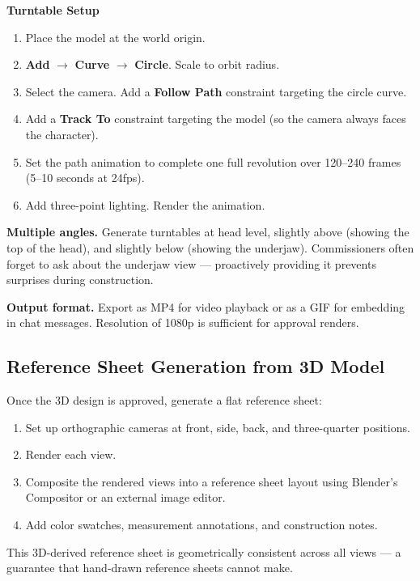 \begin{shortcutbox}
\textbf{Turntable Setup}
\begin{enumerate}[leftmargin=2em]
  \item Place the model at the world origin.
  \item \textbf{Add} $\rightarrow$ \textbf{Curve} $\rightarrow$ \textbf{Circle}. Scale to orbit radius.
  \item Select the camera. Add a \textbf{Follow Path} constraint targeting the circle curve.
  \item Add a \textbf{Track To} constraint targeting the model (so the camera always faces the character).
  \item Set the path animation to complete one full revolution over 120--240 frames (5--10 seconds at 24fps).
  \item Add three-point lighting. Render the animation.
\end{enumerate}
\end{shortcutbox}

\textbf{Multiple angles.} Generate turntables at head level, slightly above (showing the top of the head), and slightly below (showing the underjaw). Commissioners often forget to ask about the underjaw view --- proactively providing it prevents surprises during construction.

\textbf{Output format.} Export as MP4 for video playback or as a GIF for embedding in chat messages. Resolution of 1080p is sufficient for approval renders.


\subsection{Reference Sheet Generation from 3D Model}

Once the 3D design is approved, generate a flat reference sheet:

\begin{enumerate}[leftmargin=2em]
  \item Set up orthographic cameras at front, side, back, and three-quarter positions.
  \item Render each view.
  \item Composite the rendered views into a reference sheet layout using Blender's Compositor or an external image editor.
  \item Add color swatches, measurement annotations, and construction notes.
\end{enumerate}

This 3D-derived reference sheet is geometrically consistent across all views --- a guarantee that hand-drawn reference sheets cannot make.


